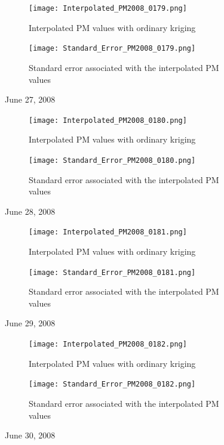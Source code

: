 \documentclass[10pt]{article}
\begin{document}
\begin{figure}[H]
\centering
\begin{subfigure}{.5\textwidth}
  \centering
  \texttt{[image: Interpolated\_PM2008\_0179.png]}
  \caption{ Interpolated PM values with ordinary kriging}
  \label{june27:sub1}
\end{subfigure}%
\begin{subfigure}{.5\textwidth}
  \centering
  \texttt{[image: Standard\_Error\_PM2008\_0179.png]}
  \caption{Standard error associated with the interpolated PM values}
  \label{june27:sub2}
\end{subfigure}
\caption{June 27, 2008}
\label{june27}
\end{figure}

\begin{figure}[H]
\centering
\begin{subfigure}{.5\textwidth}
  \centering
  \texttt{[image: Interpolated\_PM2008\_0180.png]}
  \caption{ Interpolated PM values with ordinary kriging}
  \label{june28:sub1}
\end{subfigure}%
\begin{subfigure}{.5\textwidth}
  \centering
  \texttt{[image: Standard\_Error\_PM2008\_0180.png]}
  \caption{Standard error associated with the interpolated PM values}
  \label{june2008:sub2}
\end{subfigure}
\caption{June 28, 2008}
\label{june28}
\end{figure}

\begin{figure}[H]
\centering
\begin{subfigure}{.5\textwidth}
  \centering
  \texttt{[image: Interpolated\_PM2008\_0181.png]}
  \caption{Interpolated PM values with ordinary kriging}
\end{subfigure}%
\begin{subfigure}{.5\textwidth}
  \centering
  \texttt{[image: Standard\_Error\_PM2008\_0181.png]}
  \caption{Standard error associated with the interpolated PM values}
\end{subfigure}
\caption{June 29, 2008}
\label{june29}
\end{figure}

\begin{figure}[H]
\centering
\begin{subfigure}{.5\textwidth}
  \centering
  \texttt{[image: Interpolated\_PM2008\_0182.png]}
  \caption{ Interpolated PM values with ordinary kriging}
\end{subfigure}%
\begin{subfigure}{.5\textwidth}
  \centering
  \texttt{[image: Standard\_Error\_PM2008\_0182.png]}
  \caption{Standard error associated with the interpolated PM values}
\end{subfigure}
\caption{June 30, 2008}
\label{june30}
\end{figure}
\end{document}
